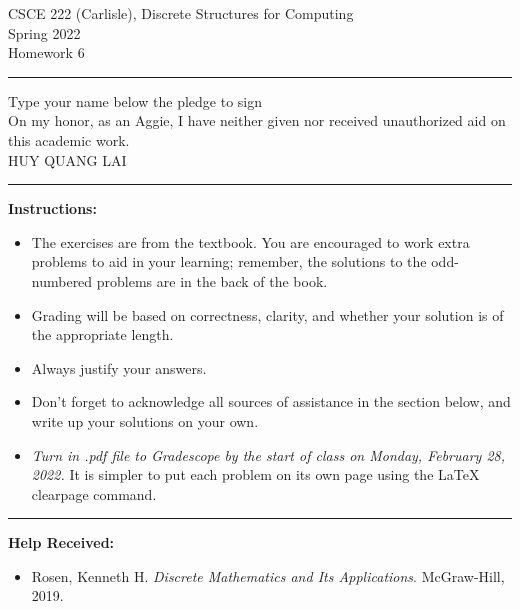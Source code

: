 \documentclass[12pt]{article}  %
\begin{document}
\begin{center}         %
{\large                %
CSCE 222 (Carlisle), Discrete Structures for Computing \\  %
Spring 2022 \\
Homework 6}
\end{center}
\rule{6in}{.1pt}       %
\begin{center}
{\large
Type your name below the pledge to sign\\
On my honor, as an Aggie, I have neither given nor received unauthorized aid on this academic work.\\
HUY QUANG LAI}
\end{center}


\rule{6in}{.1pt}       %
                    
\noindent              %
{\bf Instructions:}    %

\begin{itemize}        %
\item The exercises are from the textbook.  You are encouraged to work
      extra problems to aid in your learning; remember, the solutions to 
      the odd-numbered problems are in the back of the book.
\item Grading will be based on correctness, clarity, and whether your
      solution is of the appropriate length.
\item Always justify your answers.
\item Don't forget to acknowledge all sources of assistance in the section below, and write up your solutions on your own.
\item {\em Turn in .pdf file to Gradescope by the start of class on Monday, February 28, 2022.}  It is simpler to put each problem on its own page using the LaTeX clearpage command.
\end{itemize}


\rule{6in}{.1pt}       %

{\bf Help Received:}    %
\begin{itemize}
\item Rosen, Kenneth H. \emph{Discrete Mathematics and Its Applications}. McGraw-Hill, 2019.
\end{itemize}
\end{document}
